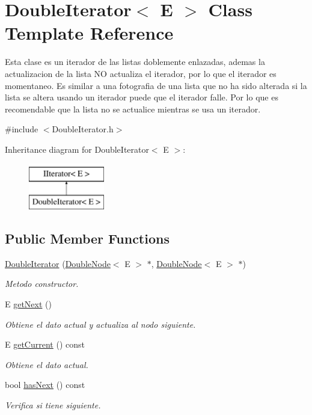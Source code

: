 \hypertarget{class_double_iterator}{\section{Double\-Iterator$<$ E $>$ Class Template Reference}
\label{class_double_iterator}
}


Esta clase es un iterador de las listas doblemente enlazadas, ademas la actualizacion de la lista N\-O actualiza el iterador, por lo que el iterador es momentaneo. Es similar a una fotografia de una lista que no ha sido alterada si la lista se altera usando un iterador puede que el iterador falle. Por lo que es recomendable que la lista no se actualice mientras se usa un iterador.  




{\ttfamily \#include $<$Double\-Iterator.\-h$>$}

Inheritance diagram for Double\-Iterator$<$ E $>$\-:\begin{figure}[H]
\begin{center}
\leavevmode
\includegraphics[height=2.000000cm]{class_double_iterator}
\end{center}
\end{figure}
\subsection*{Public Member Functions}
\begin{DoxyCompactItemize}
\item 
\hyperlink{class_double_iterator_a5b45a91dc363462fddcb4965e226e2fc}{Double\-Iterator} (\hyperlink{class_double_node}{Double\-Node}$<$ E $>$ $\ast$, \hyperlink{class_double_node}{Double\-Node}$<$ E $>$ $\ast$)
\begin{DoxyCompactList}\small\item\em Metodo constructor. \end{DoxyCompactList}\item 
E \hyperlink{class_double_iterator_aaaa1b361a61339bfee3bf86f3f67b198}{get\-Next} ()
\begin{DoxyCompactList}\small\item\em Obtiene el dato actual y actualiza al nodo siguiente. \end{DoxyCompactList}\item 
E \hyperlink{class_double_iterator_a756bb08f5352e270e08b72339c32e2be}{get\-Current} () const 
\begin{DoxyCompactList}\small\item\em Obtiene el dato actual. \end{DoxyCompactList}\item 
bool \hyperlink{class_double_iterator_adb5ef4c66649e0a4ce18e38cd85904ed}{has\-Next} () const 
\begin{DoxyCompactList}\small\item\em Verifica si tiene siguiente. \end{DoxyCompactList}\end{DoxyCompactItemize}
